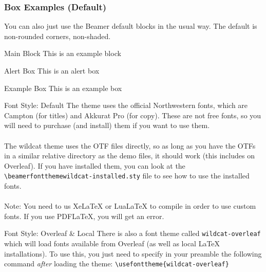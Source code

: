 \documentclass[aspectratio=1610]{beamer}
\begin{document}
\begin{frame}
    \frametitle{Box Examples (Default)}
    You can also just use the Beamer default blocks in the usual way. The default is non-rounded corners, non-shaded.
    \begin{block}{Main Block}
    This is an example block
    \end{block}
    \begin{alertblock}{Alert Box}
    This is an alert box
    \end{alertblock}
    \begin{exampleblock}{Example Box}
        This is an example box
    \end{exampleblock}
    \end{frame}

\begin{frame}{Font Style: Default}
    The theme uses the official Northwestern fonts, which are Campton (for titles) and Akkurat Pro (for copy). These are not free fonts, so you will need to purchase (and install) them if you want to use them.
    \\ ~ \\
    The wildcat theme uses the OTF files directly, so as long as you have the OTFs in a similar relative directory as the demo files, it should work (this includes on Overleaf). If you have installed them, you can look at the \texttt{\textbackslash beamerfontthemewildcat-installed.sty} file to see how to use the installed fonts.
    \\ ~ \\
    Note: You need to us XeLaTeX or LuaLaTeX to compile in order to use custom fonts. If you use PDFLaTeX, you will get an error.
\end{frame}

\begin{frame}{Font Style: Overleaf \& Local}
    There is also a font theme called \texttt{wildcat-overleaf} which will load fonts available from Overleaf (as well as local \LaTeX ~ installations). To use this, you just need to specify in your preamble the following command \textit{after} loading the theme: 
    \texttt{\textbackslash usefonttheme\{wildcat-overleaf\}}
\end{frame}
\end{document}
